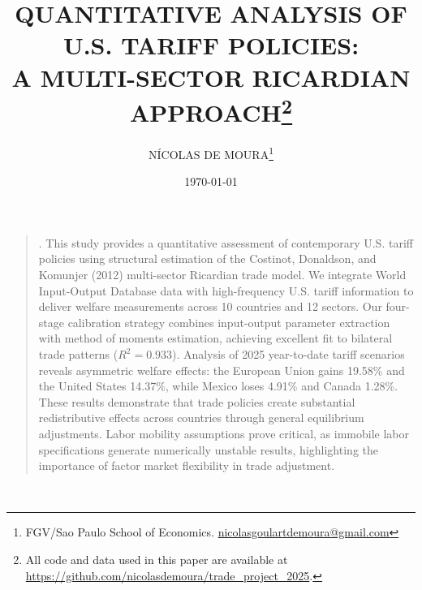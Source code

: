 \documentclass[a4paper, 12pt]{article}
\renewenvironment{abstract}
{\small\begin{quote}\noindent \par{\sc \abstractname.}}
{\noindent\end{quote}}
\begin{document}
\title{\normalsize\MakeUppercase{\bfseries 
 Quantitative Analysis of U.S. Tariff Policies:\\A Multi-Sector Ricardian Approach}\footnote{All code and data used in this paper are available at \url{https://github.com/nicolasdemoura/trade_project_2025}.}}
\date{\footnotesize\MakeUppercase\today}
\author{
    \small\MakeUppercase{Nícolas de Moura}\footnote{FGV/Sao Paulo School of Economics. \href{mailto:nicolasgoulartdemoura@gmail.com}{nicolasgoulartdemoura@gmail.com}}
}
\maketitle

\begin{abstract}
This study provides a quantitative assessment of contemporary U.S. tariff policies using structural estimation of the Costinot, Donaldson, and Komunjer (2012) multi-sector Ricardian trade model. We integrate World Input-Output Database data with high-frequency U.S. tariff information to deliver welfare measurements across 10 countries and 12 sectors. Our four-stage calibration strategy combines input-output parameter extraction with method of moments estimation, achieving excellent fit to bilateral trade patterns ($R^2 = 0.933$). Analysis of 2025 year-to-date tariff scenarios reveals asymmetric welfare effects: the European Union gains 19.58\% and the United States 14.37\%, while Mexico loses 4.91\% and Canada 1.28\%. These results demonstrate that trade policies create substantial redistributive effects across countries through general equilibrium adjustments. Labor mobility assumptions prove critical, as immobile labor specifications generate numerically unstable results, highlighting the importance of factor market flexibility in trade adjustment.
\end{abstract}



\newpage
\
\newpage
\newpage


\newpage



\newpage


% 
%
\end{document}
